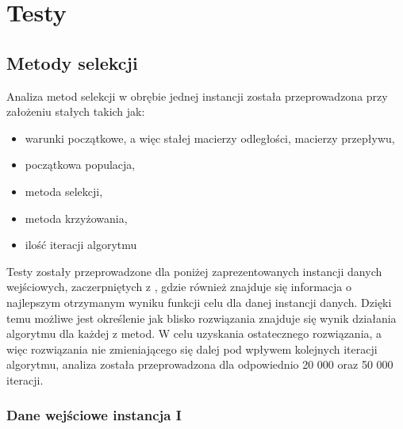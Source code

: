 \chapter{Testy}\label{cha:pierwszyDokument}






\section{Metody selekcji}\label{sec:strukturaDokumentu}

Analiza metod selekcji w obrębie jednej instancji została przeprowadzona przy założeniu stałych takich jak:
\begin{itemize}
\item
 warunki początkowe, a więc stałej macierzy odległości, macierzy przepływu,
\item
początkowa populacja,
\item
metoda selekcji,
\item
metoda krzyżowania,
\item
ilość iteracji algorytmu
\end{itemize}
\par
\vspace{0,4cm}
Testy zostały przeprowadzone dla poniżej zaprezentowanych instancji danych wejściowych, zaczerpniętych z \cite{qaplib}, gdzie również znajduje się informacja o najlepszym otrzymanym wyniku funkcji celu dla danej instancji danych. Dzięki temu możliwe jest określenie jak blisko rozwiązania znajduje się wynik działania algorytmu dla każdej z metod. W celu uzyskania ostatecznego rozwiązania, a więc rozwiązania nie zmieniającego się dalej pod wpływem kolejnych iteracji algorytmu, analiza została przeprowadzona dla odpowiednio 20 000 oraz 50 000 iteracji.\\

\subsection{Dane wejściowe instancja I}

